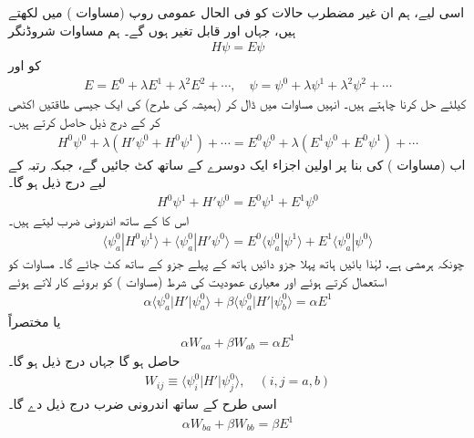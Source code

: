 اسی لیے، ہم ان  غیر مضطرب حالات کو فی الحال عمومی روپ (مساوات ) میں لکھتے ہیں، جہاں  اور  قابل تغیر ہوں گے۔ ہم مساوات شروڈنگر
\begin{align}\label{مساوات_غیر_مضطرب_مساوات_شروڈنگر}
H \psi = E \psi
\end{align}
کو  اور 
\begin{align}
E = E^0 + \lambda E^1 + \lambda^2 E^2 + \cdots, \quad \psi = \psi^0 + \lambda \psi^1 + \lambda^2 \psi^2 + \cdots
\end{align}
کیلئے حل کرنا چاہتے ہیں۔ انہیں مساوات  میں ڈال کر (ہمیشہ کی طرح)  کی ایک جیسی طاقتیں اکٹھی کر کے درج ذیل حاصل کرتے ہیں۔
\begin{align*}
H^0 \psi^0 + \lambda (H' \psi^0 + H^0 \psi^1) + \cdots = E^0 \psi^0 + \lambda (E^1 \psi^0 + E^0 \psi^1) + \cdots
\end{align*}
اب  (مساوات ) کی بنا پر اولین اجزاء ایک دوسرے کے ساتھ کٹ جائیں گے، جبکہ  رتبہ کے لیے درج ذیل ہو گا۔
\begin{align}
H^0 \psi^1 + H' \psi^0 = E^0 \psi^1 + E^1 \psi^0
\end{align}
اس کا  کے ساتھ اندرونی ضرب لیتے ہیں۔
\begin{align*} 
\langle \psi_a^0 | H^0 \psi^1 \rangle + \langle \psi_a^0 | H' \psi^0 \rangle = E^0 \langle \psi_a^0 | \psi^1 \rangle + E^1 \langle \psi_a^0 | \psi^0 \rangle
\end{align*}
چونکہ  ہرمشی ہے، لہٰذا بائیں ہاتھ پہلا جزو دائیں ہاتھ کے پہلے جزو کے ساتھ کٹ جائے گا۔ مساوات  کو استعمال کرتے ہوئے اور معیاری عمودیت کی شرط (مساوات ) کو بروئے کار لاتے ہوئے 
\begin{align*}
\alpha \langle \psi_a^0 | H' | \psi_a^0 \rangle + \beta \langle \psi_a^0 | H' | \psi_b^0 \rangle = \alpha E^1
\end{align*}
یا مختصراً
\begin{align}\label{مساوات_غیر_مضطرب_اندرونی_ضرب_اول}
\alpha W_{aa} + \beta W_{ab} = \alpha E^1
\end{align}
حاصل ہو گا جہاں درج ذیل ہو گا۔
\begin{align}\label{مساوات_غیر_مضطرب_مختصر}
W_{ij} \equiv \langle \psi_i^0 | H' | \psi_j^0 \rangle, \quad (i, j = a, b)
\end{align}
اسی طرح  کے ساتھ اندرونی ضرب درج ذیل دے گا۔
\begin{align}\label{مساوات_غیر_مضطرب_اندرونی_ضرب_دوم}
\alpha W_{ba} + \beta W_{bb} = \beta E^1
\end{align}

